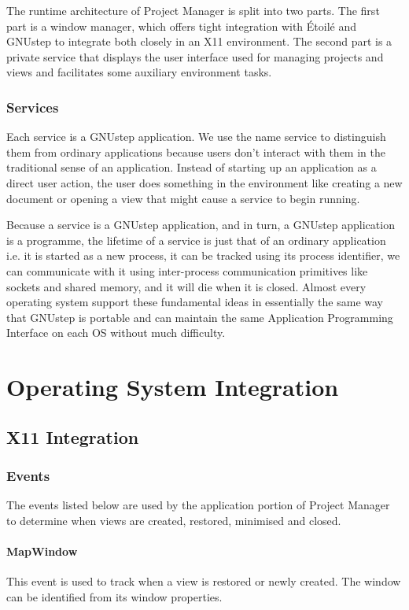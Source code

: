 \documentclass[11pt]{report}
\newcommand{\etoile}{\'Etoil\'e\xspace}
\newcommand{\proman}{Project Manager\xspace}
\begin{document}
The runtime architecture of Project Manager is split into two parts. The first part is a window manager, which offers tight integration with \etoile and GNUstep to integrate both closely in an X11 environment. The second part is a private service that displays the user interface used for managing projects and views and facilitates some auxiliary environment tasks.

\subsection{Services}
Each service is a GNUstep application. We use the name service to distinguish them from ordinary applications because users don't interact with them in the traditional sense of an application. Instead of starting up an application as a direct user action, the user does something in the environment like creating a new document or opening a view that might cause a service to begin running.

Because a service is a GNUstep application, and in turn, a GNUstep application is a programme, the lifetime of a service is just that of an ordinary application i.e. it is started as a new process, it can be tracked using its process identifier, we can communicate with it using inter-process communication primitives like sockets and shared memory, and it will die when it is closed. Almost every operating system support these fundamental ideas in essentially the same way that GNUstep is portable and can maintain the same Application Programming Interface on each OS without much difficulty.  

\chapter{Operating System Integration}
\section{X11 Integration}
\label{sec:x11_integration}
\subsection{Events}
The events listed below are used by the application portion of \proman to determine when views are created, restored, minimised and closed.
\subsubsection{MapWindow}
This event is used to track when a view is restored or newly created. The window can be identified from its window properties.
\end{document}
